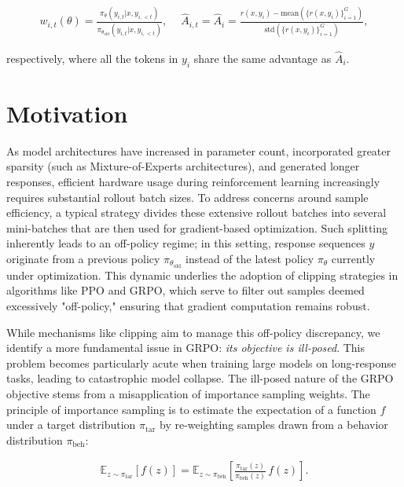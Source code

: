 \begin{align}
    w_{i,t}(\theta)=\frac{ \pi_{\theta} (y_{i,t} | x, y_{i,<t}) }{ \pi_{\theta_\text{old}} (y_{i,t} | x,y_{i,<t})},\quad\ 
    \widehat{A}_{i,t} = \widehat{A}_{i} = \frac{r(x, y_i) - \mathrm{mean} \left( \{ r(x, y_i) \}_{i=1}^G \right) }{ \mathrm{std} \left( \{ r(x, y_i) \}_{i=1}^G \right) },
\end{align}

respectively, where all the tokens in $y_i$ share the same advantage as $\widehat{A}_{i}$.

\section{Motivation}
\label{sec:motivation}

As model architectures have increased in parameter count, incorporated greater sparsity (such as Mixture-of-Experts architectures), and generated longer responses, efficient hardware usage during reinforcement learning increasingly requires substantial rollout batch sizes. To address concerns around sample efficiency, a typical strategy divides these extensive rollout batches into several mini-batches that are then used for gradient-based optimization. Such splitting inherently leads to an off-policy regime; in this setting, response sequences $y$ originate from a previous policy $\pi_{\theta_\text{old}}$ instead of the latest policy $\pi_\theta$ currently under optimization. This dynamic underlies the adoption of clipping strategies in algorithms like PPO and GRPO, which serve to filter out samples deemed excessively "off-policy," ensuring that gradient computation remains robust.

While mechanisms like clipping aim to manage this off-policy discrepancy, we identify a more fundamental issue in GRPO: \textit{its objective is ill-posed}. This problem becomes particularly acute when training large models on long-response tasks, leading to catastrophic model collapse. The ill-posed nature of the GRPO objective stems from a misapplication of importance sampling weights. The principle of importance sampling is to estimate the expectation of a function $f$ under a target distribution $\pi_\text{tar}$ by re-weighting samples drawn from a behavior distribution $\pi_\text{beh}$:

\begin{align}
\mathbb{E}_{z \sim \pi_\text{tar}} \left[ f(z) \right] = \mathbb{E}_{z \sim \pi_\text{beh}} \left[ \frac{ \pi_\text{tar} (z) }{ \pi_\text{beh} (z)} \, f(z) \right].
\end{align}

